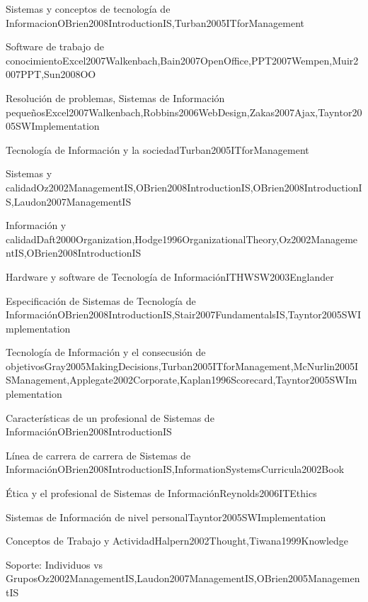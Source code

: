 \begin{LU1}{Sistemas y conceptos de tecnología de Informacion}{OBrien2008IntroductionIS,Turban2005ITforManagement}{}
\begin{LU2}{Software de trabajo de conocimiento}{Excel2007Walkenbach,Bain2007OpenOffice,PPT2007Wempen,Muir2007PPT,Sun2008OO}{}
\begin{LU3}{Resolución de problemas, Sistemas de Información pequeños}{Excel2007Walkenbach,Robbins2006WebDesign,Zakas2007Ajax,Tayntor2005SWImplementation}{}
\begin{LU4}{Tecnología de Información y la sociedad}{Turban2005ITforManagement}{}
\begin{LU5}{Sistemas y calidad}{Oz2002ManagementIS,OBrien2008IntroductionIS,OBrien2008IntroductionIS,Laudon2007ManagementIS}{}
\begin{LU6}{Información y calidad}{Daft2000Organization,Hodge1996OrganizationalTheory,Oz2002ManagementIS,OBrien2008IntroductionIS}{}
\begin{LU7}{Hardware y software de Tecnología de Información}{ITHWSW2003Englander}{}
\begin{LU8}{Especificación de Sistemas de Tecnología de Información}{OBrien2008IntroductionIS,Stair2007FundamentalsIS,Tayntor2005SWImplementation}{}
\begin{LU9}{Tecnología de Información y el consecusión de objetivos}{Gray2005MakingDecisions,Turban2005ITforManagement,McNurlin2005ISManagement,Applegate2002Corporate,Kaplan1996Scorecard,Tayntor2005SWImplementation}{}
\begin{LU10}{Características de un profesional de Sistemas de Información}{OBrien2008IntroductionIS}{}
\begin{LU11}{Línea de carrera de carrera de Sistemas de Información}{OBrien2008IntroductionIS,InformationSystemsCurricula2002Book}{}
\begin{LU12}{Ética y el profesional de Sistemas de Información}{Reynolds2006ITEthics}{}
\begin{LU13}{Sistemas de Información de nivel personal}{Tayntor2005SWImplementation}{}
\begin{LU13.01}[LU13]{Conceptos de Trabajo y Actividad}{Halpern2002Thought,Tiwana1999Knowledge}{}
\begin{LU13.02}[LU13]{Soporte: Individuos vs Grupos}{Oz2002ManagementIS,Laudon2007ManagementIS,OBrien2005ManagementIS}{}
\end{LU13.02}
\end{LU13.01}
\end{LU13}
\end{LU12}
\end{LU11}
\end{LU10}
\end{LU9}
\end{LU8}
\end{LU7}
\end{LU6}
\end{LU5}
\end{LU4}
\end{LU3}
\end{LU2}
\end{LU1}
